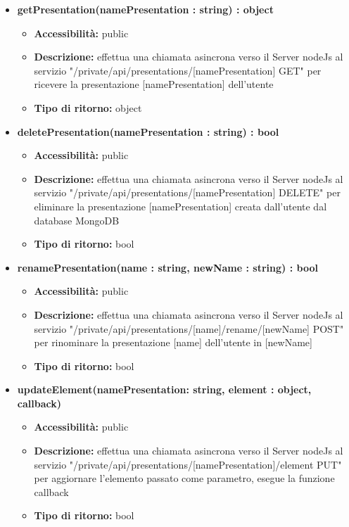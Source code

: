 {{\begin{itemize}
		\item \textbf{getPresentation(namePresentation : string) : object}
			\begin{itemize}
			\item \textbf{Accessibilit\`{a}:} public
			\item \textbf{Descrizione:} effettua una chiamata asincrona verso il Server nodeJs al servizio "/private/api/presentations/[namePresentation] GET" per ricevere la presentazione [namePresentation] dell'utente
			\item \textbf{Tipo di ritorno:} object
			\end{itemize}
			
		\item \textbf{deletePresentation(namePresentation : string) : bool}
			\begin{itemize}
			\item \textbf{Accessibilit\`{a}:} public
			\item \textbf{Descrizione:} effettua una chiamata asincrona verso il Server nodeJs al servizio "/private/api/presentations/[namePresentation] DELETE" per eliminare la presentazione [namePresentation] creata dall'utente dal database MongoDB
			\item \textbf{Tipo di ritorno:} bool
			\end{itemize}
			
		\item \textbf{renamePresentation(name : string, newName : string) : bool}
			\begin{itemize}
			\item \textbf{Accessibilit\`{a}:} public
			\item \textbf{Descrizione:} effettua una chiamata asincrona verso il Server nodeJs al servizio "/private/api/presentations/[name]/rename/[newName] POST" per rinominare la presentazione [name] dell'utente in [newName] 
			\item \textbf{Tipo di ritorno:} bool
			\end{itemize}
			
		\item \textbf{updateElement(namePresentation: string, element : object, callback) }
			\begin{itemize}
			\item \textbf{Accessibilit\`{a}:} public
			\item \textbf{Descrizione:} effettua una chiamata asincrona verso il Server nodeJs al servizio "/private/api/presentations/[namePresentation]/element PUT" per aggiornare l'elemento passato come parametro, esegue la funzione callback
			\item \textbf{Tipo di ritorno:} bool
			\end{itemize}
			

\end{itemize}}}
